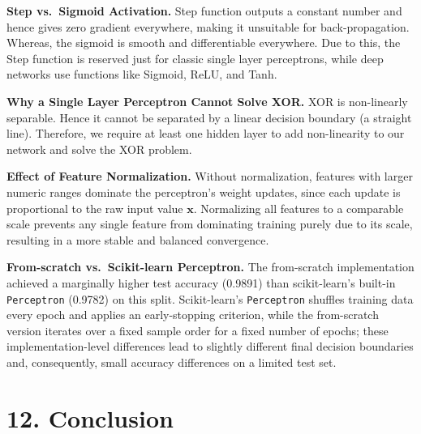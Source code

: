 \documentclass[11pt]{article}
\begin{document}
\textbf{Step vs.\ Sigmoid Activation.} Step function outputs a constant number and hence gives zero gradient everywhere, making it unsuitable for back-propagation. Whereas, the sigmoid is smooth and differentiable everywhere. Due to this, the Step function is reserved just for classic single layer perceptrons, while deep networks use functions like Sigmoid, ReLU, and Tanh.

\vspace{2mm}

\textbf{Why a Single Layer Perceptron Cannot Solve XOR.} XOR is non-linearly separable. Hence it cannot be separated by a linear decision boundary (a straight line). Therefore, we require at least one hidden layer to add non-linearity to our network and solve the XOR problem.

\vspace{2mm}

\textbf{Effect of Feature Normalization.} Without normalization, features with larger numeric ranges dominate the perceptron's weight updates, since each update is proportional to the raw input value $\mathbf{x}$. Normalizing all features to a comparable scale prevents any single feature from dominating training purely due to its scale, resulting in a more stable and balanced convergence.

\vspace{2mm}

\textbf{From-scratch vs.\ Scikit-learn Perceptron.} The from-scratch implementation achieved a marginally higher test accuracy (0.9891) than scikit-learn's built-in \texttt{Perceptron} (0.9782) on this split. Scikit-learn's \texttt{Perceptron} shuffles training data every epoch and applies an early-stopping criterion, while the from-scratch version iterates over a fixed sample order for a fixed number of epochs; these implementation-level differences lead to slightly different final decision boundaries and, consequently, small accuracy differences on a limited test set.

\section*{12. Conclusion}
\end{document}
